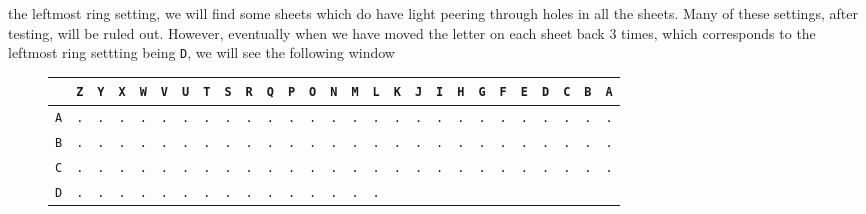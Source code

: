 the leftmost ring setting, we will find some sheets which do have
light peering through holes in all the sheets. Many of these
settings, after testing, will be ruled out. However, eventually when
we have moved the letter on each sheet back $3$ times, which
corresponds to the leftmost ring settting being \texttt{D}, we will
see the following window
\begin{figure}[H]
	\begin{center}
		\scalebox{0.5} {
			\begin{tabular}{c|cccccccccccccccccccccccccc}
				           & \texttt{Z} & \texttt{Y} & \texttt{X} & \texttt{W} &
				\texttt{V} & \texttt{U} & \texttt{T} & \texttt{S} &
				\texttt{R} & \texttt{Q} & \texttt{P} & \texttt{O} &
				\texttt{N} & \texttt{M} & \texttt{L} & \texttt{K} &
				\texttt{J} & \texttt{I} & \texttt{H} & \texttt{G} &
				\texttt{F} & \texttt{E} & \texttt{D} & \texttt{C} &
				\texttt{B} & \texttt{A}                                          \\ \hline
				\texttt{A} & \texttt{.} & \texttt{.} & \texttt{.} &
				\texttt{.} & \texttt{.} & \texttt{.} & \texttt{.} &
				\texttt{.} & \texttt{.} & \texttt{.} & \texttt{.} &
				\texttt{.} & \texttt{.} & \texttt{.} & \texttt{.} &
				\texttt{.} & \texttt{.} & \texttt{.} & \texttt{.} &
				\texttt{.} & \texttt{.} & \texttt{.} & \texttt{.} &
				\texttt{.} & \texttt{.} & \texttt{.}                             \\
				\texttt{B} & \texttt{.} & \texttt{.} & \texttt{.} &
				\texttt{.} & \texttt{.} & \texttt{.} & \texttt{.} &
				\texttt{.} & \texttt{.} & \texttt{.} & \texttt{.} &
				\texttt{.} & \texttt{.} & \texttt{.} & \texttt{.} &
				\texttt{.} & \texttt{.} & \texttt{.} & \texttt{.} &
				\texttt{.} & \texttt{.} & \texttt{.} & \texttt{.} &
				\texttt{.} & \texttt{.} & \texttt{.}                             \\
				\texttt{C} & \texttt{.} & \texttt{.} & \texttt{.} &
				\texttt{.} & \texttt{.} & \texttt{.} & \texttt{.} &
				\texttt{.} & \texttt{.} & \texttt{.} & \texttt{.} &
				\texttt{.} & \texttt{.} & \texttt{.} & \texttt{.} &
				\texttt{.} & \texttt{.} & \texttt{.} & \texttt{.} &
				\texttt{.} & \texttt{.} & \texttt{.} & \texttt{.} &
				\texttt{.} & \texttt{.} & \texttt{.}                             \\
				\texttt{D} & \texttt{.} & \texttt{.} & \texttt{.} &
				\texttt{.} & \texttt{.} & \texttt{.} & \texttt{.} &
				\texttt{.} & \texttt{.} & \texttt{.} & \texttt{.} &
				\texttt{.} & \texttt{.} & \texttt{.} & \texttt{.} &

\end{tabular}}
\end{center}
\end{figure}
